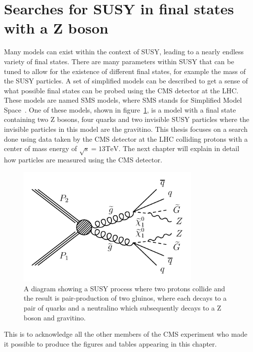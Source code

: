 \section{Searches for SUSY in final states with a Z boson}
\label{sec:signalmodel}
Many models can exist within the context of SUSY, leading to a nearly endless variety of final states.
There are many parameters within SUSY that can be tuned to allow for the existence of different final states, for example the mass of the SUSY particles.
A set of simplified models can be described to get a sense of what possible final states can be probed using the CMS detector at the LHC.
These models are named SMS models, where SMS stands for Simplified Model Space~\cite{sms}.
One of these models, shown in figure~\ref{fig:SMS_T5ZZgmsb}, is a model with a final state containing two Z bosons,
four quarks and two invisible SUSY particles where the invisible particles in this model are the gravitino.
This thesis focuses on a search done using data taken by the CMS detector at the LHC colliding protons with a center of mass energy of $\mathrm{\sqrt{s}=13 TeV}$.
The next chapter will explain in detail how particles are measured using the CMS detector.

\begin{figure}[!htb]
  \begin{center}
    \includegraphics[width=0.8\textwidth]{intro/figs/Feynman_graph_T5ZZgmsb.pdf}
    \caption{
      \label{fig:SMS_T5ZZgmsb}
      A diagram showing a SUSY process where two protons collide and the result is pair-production of two gluinos,
      where each decays to a pair of quarks and a neutralino which subsequently decays to a Z boson and gravitino.
    }
  \end{center}
\end{figure}

This is to acknowledge all the other members of the CMS experiment who made it possible to produce
the figures and tables appearing in this chapter.
